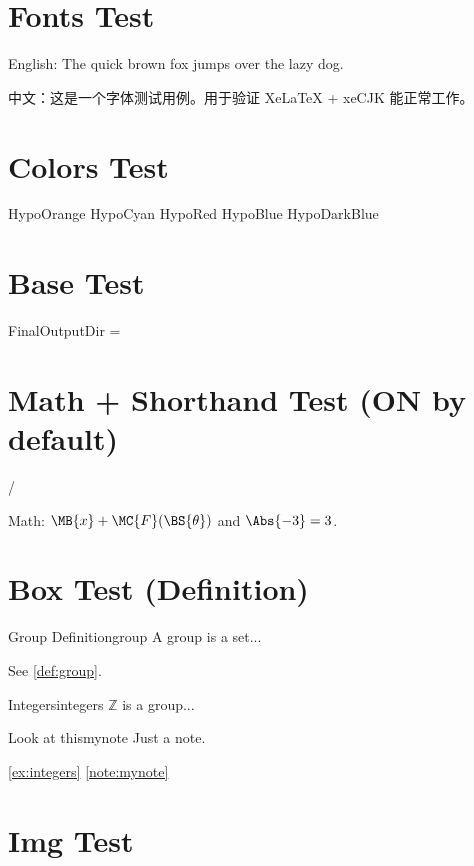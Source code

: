 \documentclass{article}
\begin{document}
\section*{Fonts Test}

English: The quick brown fox jumps over the lazy dog.

中文：这是一个字体测试用例。用于验证 XeLaTeX + xeCJK 能正常工作。

\section*{Colors Test}
{\color{HypoOrange}HypoOrange}\quad
{\color{HypoCyan}HypoCyan}\quad
{\color{HypoRed}HypoRed}\quad
{\color{HypoBlue}HypoBlue}\quad
{\color{HypoDarkBlue}HypoDarkBlue}

\section*{Base Test}
FinalOutputDir = \texttt{\FinalOutputDir}

\section*{Math + Shorthand Test (ON by default)}
 / 

Math: $\MB{x} + \MC{F}(\BS{\theta})$ and $\Abs{-3} = 3$.

\section*{Box Test (Definition)}
\begin{definition}{Group Definition}{group}
  A group is a set...
\end{definition}

See \cref{def:group}.

\begin{example}{Integers}{integers}
  $\mathbb{Z}$ is a group...
\end{example}


\begin{note}{Look at this}{mynote}
  Just a note.
\end{note}

\cref{ex:integers}
\cref{note:mynote}

\section*{Img Test}
\end{document}
